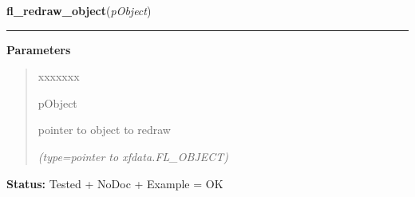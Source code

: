     \label{xformslib:library:fl_redraw_object}

    \vspace{0.5ex}

\hspace{.8\funcindent}\begin{boxedminipage}{\funcwidth}

    \raggedright \textbf{fl\_redraw\_object}(\textit{pObject})

    \vspace{-1.5ex}

    \rule{\textwidth}{0.5\fboxrule}
\setlength{\parskip}{2ex}
\setlength{\parskip}{1ex}
      \textbf{Parameters}
      \vspace{-1ex}

      \begin{quote}
        \begin{Ventry}{xxxxxxx}

          \item[pObject]

          pointer to object to redraw

            {\it (type=pointer to xfdata.FL\_OBJECT)}

        \end{Ventry}

      \end{quote}

\textbf{Status:} Tested + NoDoc + Example = OK



    \end{boxedminipage}

    \label{xformslib:library:fl_scale_object}

    \vspace{0.5ex}

